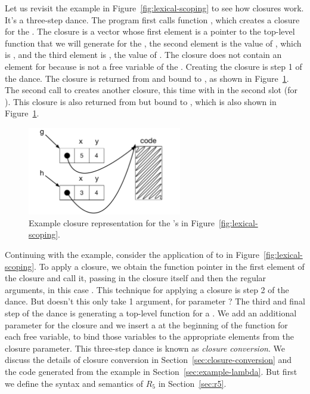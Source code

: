 \documentclass[11pt]{book}
\begin{document}
Let us revisit the example in Figure~\ref{fig:lexical-scoping} to see
how closures work. It's a three-step dance. The program first calls
function , which creates a closure for the . The
closure is a vector whose first element is a pointer to the top-level
function that we will generate for the , the second
element is the value of , which is , and the third
element is , the value of . The closure does not
contain an element for  because  is not a free
variable of the . Creating the closure is step 1 of the
dance. The closure is returned from  and bound to , as
shown in Figure~\ref{fig:closures}.
%
The second call to  creates another closure, this time with
 in the second slot (for ). This closure is also
returned from  but bound to , which is also shown in
Figure~\ref{fig:closures}.

\begin{figure}[tbp]
\centering \includegraphics[width=0.6\textwidth]{figs/closures}
\caption{Example closure representation for the 's
  in Figure~\ref{fig:lexical-scoping}.}
\label{fig:closures}
\end{figure}

Continuing with the example, consider the application of  to
 in Figure~\ref{fig:lexical-scoping}.  To apply a closure, we
obtain the function pointer in the first element of the closure and
call it, passing in the closure itself and then the regular arguments,
in this case . This technique for applying a closure is step
2 of the dance.
%
But doesn't this  only take 1 argument, for parameter
? The third and final step of the dance is generating a
top-level function for a .  We add an additional
parameter for the closure and we insert a  at the beginning
of the function for each free variable, to bind those variables to the
appropriate elements from the closure parameter.
%
This three-step dance is known as \emph{closure conversion}.  We
discuss the details of closure conversion in
Section~\ref{sec:closure-conversion} and the code generated from the
example in Section~\ref{sec:example-lambda}. But first we define the
syntax and semantics of $R_5$ in Section~\ref{sec:r5}.
\end{document}
